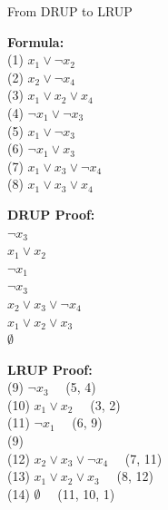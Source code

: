 \documentclass[t,english]{sdqbeamer}
\begin{document}
\begin{frame}{From DRUP to LRUP~\cite{cruz2017efficient}}
	\pause
	\vspace*{3mm}
	\begin{center}
		\begin{minipage}[c][8cm][t]{0.3\textwidth}
			\textbf{Formula:}\\[1mm]
			\ttfamily%
			(1) $x_1 \vee \neg x_2$ \\
			(2) $x_2 \vee \neg x_4$ \\
			(3) $x_1 \vee x_2 \vee x_4$ \\
			(4) $\neg x_1 \vee \neg x_3$ \\
			(5) $x_1 \vee \neg x_3$ \\
			(6) $\neg x_1 \vee x_3$ \\
			(7) $x_1 \vee x_3 \vee \neg x_4$ \\
			(8) $x_1 \vee x_3 \vee x_4$
		\end{minipage}%
		\begin{minipage}[c][8cm][t]{0.3\textwidth}
			\textbf{DRUP Proof:}\\[1mm]
			\ttfamily%
			 $\neg x_3$\\
			 $x_1 \vee x_2$\\
			 $\neg x_1$\\
			 $\neg x_3$\\
			 $x_2 \vee x_3 \vee \neg x_4$\\
			 $x_1 \vee x_2 \vee x_3$\\
			 $\emptyset$
		\end{minipage}%
		\begin{minipage}[c][8cm][t]{0.3\textwidth}
			\textbf{LRUP Proof:}\\[1mm]
			\ttfamily%
			 (9) $\neg x_3$ \ \ (5, 4)\\
			 (10) $x_1 \vee x_2$ \ \ (3, 2)\\
			 (11) $\neg x_1$ \ \ (6, 9)\\
			 (9) \\
			 (12) $x_2 \vee x_3 \vee \neg x_4$ \ \ (7, 11)\\
			 (13) $x_1 \vee x_2 \vee x_3$ \ \ (8, 12)\\
			 (14) $\emptyset$ \ \ (11, 10, 1)\\
		\end{minipage}
	\end{center}
\end{frame}
\end{document}
